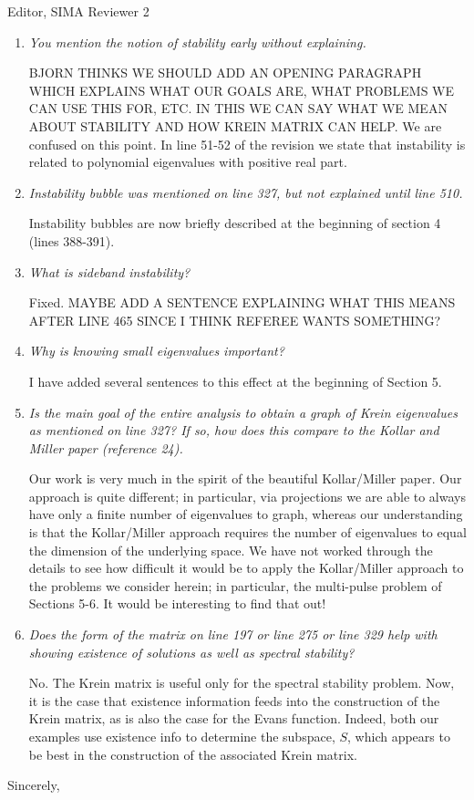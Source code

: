 \documentclass[11pt]{letter}
\begin{document}
\begin{letter}{Editor, SIMA}
Reviewer 2
\begin{enumerate}
\item \emph{You mention the notion of stability early without explaining.}
\vspace{4mm}

BJORN THINKS WE SHOULD ADD AN OPENING PARAGRAPH WHICH EXPLAINS WHAT OUR GOALS ARE, WHAT PROBLEMS WE CAN USE THIS FOR, ETC. IN THIS WE CAN SAY WHAT WE MEAN ABOUT STABILITY AND HOW KREIN MATRIX CAN HELP.
We are confused on this point. In line 51-52 of the revision we state that instability is related to polynomial eigenvalues with positive real part.

\item \emph{Instability bubble was mentioned on line 327, but not explained until line 510.}

Instability bubbles are now briefly described at the beginning of section 4 (lines 388-391).

\item \emph{What is sideband instability?}

Fixed. MAYBE ADD A SENTENCE EXPLAINING WHAT THIS MEANS AFTER LINE 465 SINCE I THINK REFEREE WANTS SOMETHING?

\item \emph{Why is knowing small eigenvalues important?}

I have added several sentences to this effect at the beginning of Section 5.

\item \emph{Is the main goal of the entire analysis to obtain a graph of Krein eigenvalues as mentioned on line 327? If so, how does this compare to the Kollar and Miller paper (reference 24). }

Our work is very much in the spirit of the beautiful Kollar/Miller paper. Our approach is quite different; in particular, via projections we are able to always have only a finite number of eigenvalues to graph, whereas our understanding is that the Kollar/Miller approach requires the number of eigenvalues to equal the dimension of the underlying space. We have not worked through the details to see how difficult it would be to apply the Kollar/Miller approach to the problems we consider herein; in particular, the multi-pulse problem of Sections 5-6. It would be interesting to find that out!

\item \emph{Does the form of the matrix on line 197 or line 275 or line 329 help with showing existence of solutions as well as spectral stability?}

No. The Krein matrix is useful only for the spectral stability problem. Now, it is the case that existence information feeds into the construction of the Krein matrix, as is also the case for the Evans function. Indeed, both our examples use existence info to determine the subspace, $S$, which appears to be best in the construction of the associated Krein matrix.

\end{enumerate}


\closing{Sincerely,}

\end{letter}
\end{document}
